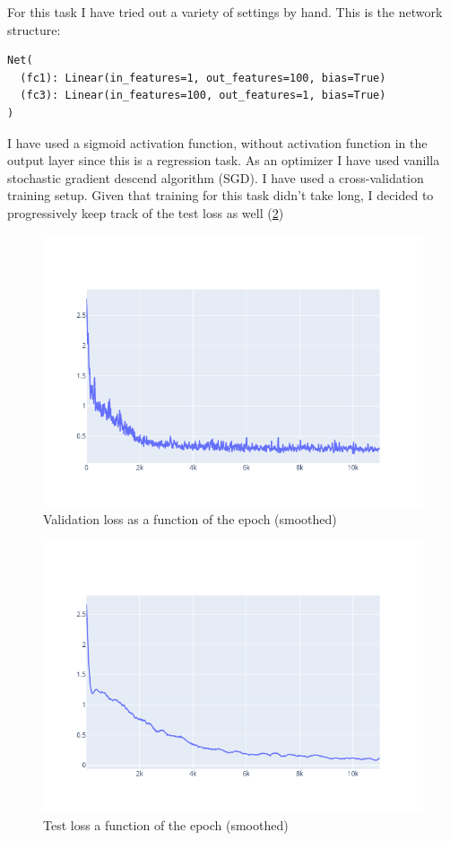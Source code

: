 \documentclass{article}
\begin{document}
For this task I have tried out a variety of settings by hand. This is the network structure:
\begin{lstlisting}
Net(
  (fc1): Linear(in_features=1, out_features=100, bias=True)
  (fc3): Linear(in_features=100, out_features=1, bias=True)
)
\end{lstlisting}

I have used a sigmoid activation function, without activation function in the output layer since this is a regression task.
As an optimizer I have used vanilla stochastic gradient descend algorithm (SGD). I have used a cross-validation training setup. Given that training for this task didn't take long, I decided to progressively keep track of the test loss as well (\figurename{\ref{test_loss}})

\begin{figure}[H]
    \includegraphics[width=\linewidth]{regression_task/imgs/val_loss.png}
    \caption{Validation loss as a function of the epoch (smoothed)}\label{val_loss}
\end{figure}
\begin{figure}[H]
    \includegraphics[width=\linewidth]{regression_task/imgs/test_loss.png}
    \caption{Test loss a function of the epoch (smoothed)}\label{test_loss}
\end{figure}
\end{document}
